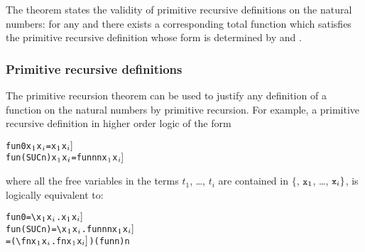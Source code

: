 {\noindent The theorem states the validity of primitive recursive
definitions on the natural numbers: for any  and  there exists a
corresponding total function  which satisfies
the primitive recursive definition whose form is determined by  and
.

\subsubsection{Primitive recursive definitions}\label{num-prim-rec}

The primitive recursion theorem
can be used to justify any  definition of a function on the  natural numbers by primitive  recursion.   For example, a
primitive recursive definition in higher order logic of the form

\begin{hol}\begin{alltt}
   fun 0       x\(\sb{1}\) \m{\dots} x\(\sb{i}\) = \m{f\sb{1}[}x\(\sb{1}\)\m{,\ldots,\,} x\(\sb{i}]\)
   fun (SUC n) x\(\sb{1}\) \m{\dots} x\(\sb{i}\) = \m{f\sb{2}[}fun n  n\m{,} x\(\sb{1}\)\m{,\ldots,\,}x\(\sb{i}]\)
\end{alltt}\end{hol}

\noindent where all the free variables in the  terms $t_1$,
\dots, $t_i$ are contained in $\{$, $\ml{x}_1$, \dots, $\ml{x}_i\}$,
is logically equivalent to:

\begin{hol}\begin{alltt}
   fun 0       = \verb!\!x\(\sb{1}\) \m{\dots} x\(\sb{i}\).\m{f\sb{1}[}x\(\sb{1}\)\m{,\ldots,\,}x\(\sb{i}]\)
   fun (SUC n) = \verb!\!x\(\sb{1}\) \m{\dots} x\(\sb{i}\).\m{f\sb{2}[}fun n  n\m{,}x\(\sb{1}\)\m{,\ldots,\,}x\(\sb{i}]\)
               = (\verb!\!f n x\(\sb{1}\) \m{\dots} x\(\sb{i}\).\m{f\sb{2}[}f  n\m{,} x\(\sb{1}\)\m{,\ldots,\,}x\(\sb{i}]\)) (fun n) n
\end{alltt}\end{hol}

}

